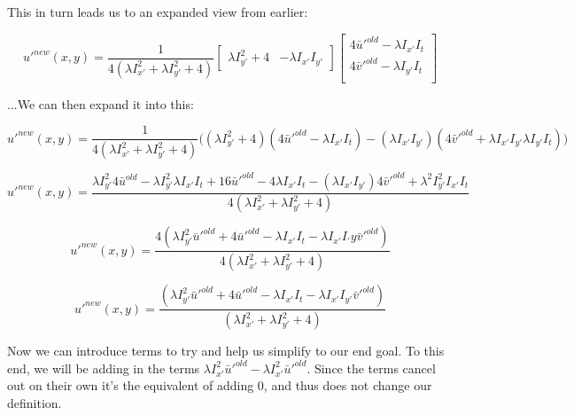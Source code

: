\documentclass{article}
\begin{document}
\noindent This in turn leads us to an expanded view from earlier:

\begin{equation}
    u'^{new}(x,y) =
    \frac{1}{4(\lambda I_{x'}^2 + \lambda I_{y'}^2 + 4)}
    \begin{bmatrix}
        \lambda I_{y'}^2 + 4 & -\lambda I_{x'} I_{y'}
    \end{bmatrix}
    \begin{bmatrix}
        4\bar{u}'^{old}-\lambda I_{x'} I_t \\
        4\bar{v}'^{old}-\lambda I_{y'} I_t \\
    \end{bmatrix}
\end{equation}

\noindent ...We can then expand it into this:

\begin{equation}
    u'^{new}(x,y) = \frac{1}{4(\lambda I_{x'}^2 + \lambda I_{y'}^2 + 4)}
    \big(
    (\lambda I_{y'}^2 +4)(4\bar{u}'^{old}-\lambda I_{x'} I_t) - (\lambda I_{x'} I_{y'})(4\bar{v}'^{old}+\lambda I_{x'} I_{y'} \lambda I_{y'} I_t)
    )
\end{equation}

\begin{equation}
    u'^{new}(x,y) = \frac
    {\lambda I_{y'}^2 4\bar{u}^{old}-\lambda I_{y'}^2 \lambda I_{x'} I_t + 16\bar{u}'^{old}-4\lambda I_{x'} I_t-(\lambda I_{x'} I_{y'})4\bar{v}'^{old}+\lambda^2 I_{y'}^2 I_{x'} I_t}
    {4(\lambda I_{x'}^2 + \lambda I_{y'}^2 + 4)}
\end{equation}

\begin{equation}
    u'^{new}(x,y) = \frac
    {4(\lambda I_{y'}^2 \bar{u}'^{old} + 4\bar{u}'^{old} - \lambda I_{x'} I_t - \lambda I_{x'} I_{'}y \bar{v}'^{old})}
    {4(\lambda I_{x'}^2 + \lambda I_{y'}^2 + 4)}
\end{equation}

\begin{equation}
    u'^{new}(x,y) = \frac
    {(\lambda I_{y'}^2 \bar{u}'^{old} + 4\bar{u}'^{old} - \lambda I_{x'} I_t - \lambda I_{x'} I_{y'} \bar{v}'^{old})}
    {(\lambda I_{x'}^2 + \lambda I_{y'}^2 + 4)}
\end{equation}

\noindent Now we can introduce terms to try and help us simplify to our end goal. To this end, we will be adding in the terms $\lambda I_{x'}^2\bar{u}'^{old} -\lambda I_{x'}^2\bar{u}'^{old}$. Since the terms cancel out on their own it's the equivalent of adding 0, and thus does not change our definition.
\end{document}
